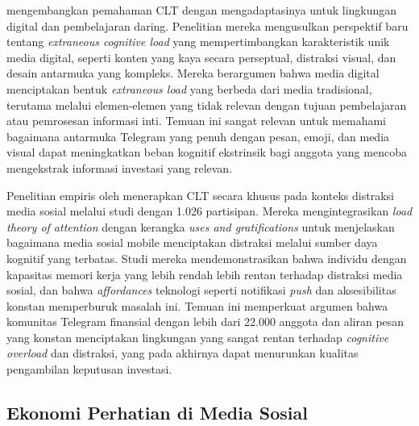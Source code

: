 \textcite{skulmowski2022} mengembangkan pemahaman CLT dengan mengadaptasinya untuk lingkungan digital dan pembelajaran daring. Penelitian mereka mengusulkan perspektif baru tentang \textit{extraneous cognitive load} yang mempertimbangkan karakteristik unik media digital, seperti konten yang kaya secara perseptual, distraksi visual, dan desain antarmuka yang kompleks. Mereka berargumen bahwa media digital menciptakan bentuk \textit{extraneous load} yang berbeda dari media tradisional, terutama melalui elemen-elemen yang tidak relevan dengan tujuan pembelajaran atau pemrosesan informasi inti. Temuan ini sangat relevan untuk memahami bagaimana antarmuka Telegram yang penuh dengan pesan, emoji, dan media visual dapat meningkatkan beban kognitif ekstrinsik bagi anggota yang mencoba mengekstrak informasi investasi yang relevan.

Penelitian empiris oleh \textcite{sidnammauch2024} menerapkan CLT secara khusus pada konteks distraksi media sosial melalui studi dengan 1.026 partisipan. Mereka mengintegrasikan \textit{load theory of attention} dengan kerangka \textit{uses and gratifications} untuk menjelaskan bagaimana media sosial mobile menciptakan distraksi melalui sumber daya kognitif yang terbatas. Studi mereka mendemonstrasikan bahwa individu dengan kapasitas memori kerja yang lebih rendah lebih rentan terhadap distraksi media sosial, dan bahwa \textit{affordances} teknologi seperti notifikasi \textit{push} dan aksesibilitas konstan memperburuk masalah ini. Temuan ini memperkuat argumen bahwa komunitas Telegram finansial dengan lebih dari 22.000 anggota dan aliran pesan yang konstan menciptakan lingkungan yang sangat rentan terhadap \textit{cognitive overload} dan distraksi, yang pada akhirnya dapat menurunkan kualitas pengambilan keputusan investasi.

\subsection{Ekonomi Perhatian di Media Sosial}


